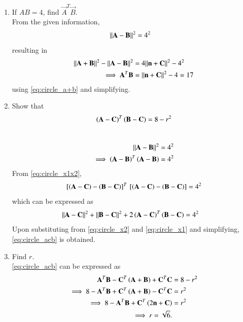 \documentclass[journal,12pt,twocolumn]{IEEEtran}
\renewcommand\thesection{\arabic{section}}
\begin{document}
\begin{enumerate}[label=\thesection.\arabic*
,ref=\thesection.\theenumi]
\begin{align}
\\
\implies \vec{n}^T\vec{A}+\vec{n}^T\vec{B}-2\vec{n}^T\vec{C} &= k\vec{n}^T\vec{n}
\\
\implies \frac{\vec{n}^T\vec{A}+\vec{n}^T\vec{B}-2\vec{n}^T\vec{C}}{\vec{n}^T\vec{n}} &= k
\\
\implies k &= 2
\end{align}
using \eqref{eq:circle_abtangent}.
Substituting in \eqref{eq:circle_abkn}
\begin{align}
\vec{A}+\vec{B} &= 2\brak{\vec{n}+\vec{C}}
\label{eq:circle_a+b}
\end{align}
%
\item If $AB = 4$, find $\vec{A}^T\vec{B}$.
%
\\
\solution From the given information,
\begin{align}
\lVert\mathbf{A}-\mathbf{B}\rVert^2 &= 4^2
\end{align}
resulting in
\begin{align}
\lVert\mathbf{A}+\mathbf{B}\rVert^2-\lVert\mathbf{A}-\mathbf{B}\rVert^2 &= 4\lVert\mathbf{n}+\mathbf{C}\rVert^2-4^2
\\
\implies\mathbf{A}^T\mathbf{B} &= \lVert\mathbf{n}+\mathbf{C}\rVert^2-4 = 17
\end{align}
using \eqref{eq:circle_a+b} and simplifying.
%
\item Show that
\begin{equation}
\label{eq:circle_acb}
\left(\mathbf{A}-\mathbf{C}\right)^T\left(\mathbf{B}-\mathbf{C}\right) =8 - r^2
\end{equation}
\\
\solution
\begin{align}
\lVert\mathbf{A}-\mathbf{B}\rVert^2 &= 4^2
\\
\implies\left(\mathbf{A}-\mathbf{B}\right)^T\left( \mathbf{A}-\mathbf{B} \right) &= 4^2
\label{eq:circle_x1x2}
\end{align}
%
From \eqref{eq:circle_x1x2},
\begin{align}
{}\left[\left(\mathbf{A}-\mathbf{C}\right)-\left(\mathbf{B}- \mathbf{C}\right)\right]^T{}\left[ 
\left(\mathbf{A}-\mathbf{C}\right)-\left(\mathbf{B}- \mathbf{C}\right)\right] = 4^2
\end{align}
%
which can be expressed as
\begin{align}
\lVert\mathbf{A}-\mathbf{C}\rVert^2+\lVert\mathbf{B}-\mathbf{C}\rVert^2 &
+ 2\left(\mathbf{A}-\mathbf{C}\right)^T\left(\mathbf{B}-\mathbf{C}\right) 
= 4^2
\end{align}
Upon substituting from \eqref{eq:circle_x2} and  \eqref{eq:circle_x1} and simplifying, \eqref{eq:circle_acb}
is obtained.
\item Find $r$.
\\
\solution \eqref{eq:circle_acb} can be expressed as
\begin{align}
 \mathbf{A}^T\mathbf{B}  -\mathbf{C}^T\left(\mathbf{A}+\mathbf{B}\right)+\mathbf{C}^T\mathbf{C} &=8 - r^2
\\
\implies 8 - \mathbf{A}^T\mathbf{B}  +\mathbf{C}^T\left(\mathbf{A}+\mathbf{B}\right)-\mathbf{C}^T\mathbf{C} &= r^2
\\
\implies 8 - \mathbf{A}^T\mathbf{B}  +\mathbf{C}^T\left(2\mathbf{n}+\mathbf{C}\right) &= r^2
\\
\implies r =  \sqrt{6}.
\end{align}

\end{enumerate}
%
\end{document}
